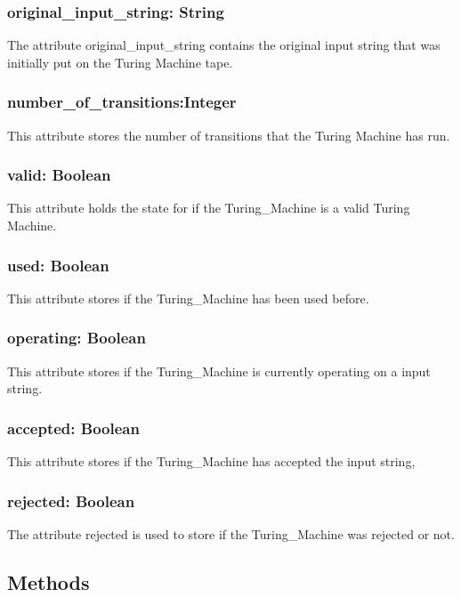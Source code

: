 \documentclass{report}
\begin{document}
      \subsubsection{ original\_input\_string: String }
      The attribute original\_input\_string contains the original input string that was initially put on the Turing Machine tape.
      
      \subsubsection{ number\_of\_transitions:Integer  }
      This attribute stores the number of transitions that the Turing Machine has run.
      
      \subsubsection{ valid: Boolean  }
      This attribute holds the state for if the Turing\_Machine is a valid Turing Machine.
      
      \subsubsection{ used: Boolean }
      This attribute stores if the Turing\_Machine has been used before.
      
      \subsubsection{ operating: Boolean  }
      This attribute stores if the Turing\_Machine is currently operating on a input string.
      
      \subsubsection{ accepted: Boolean  }
      This attribute stores if the Turing\_Machine has accepted the input string,
      
      \subsubsection{ rejected: Boolean  }
      The attribute rejected is used to store if the Turing\_Machine was rejected or not.
    
     \subsection{Methods} 
    
\end{document}
